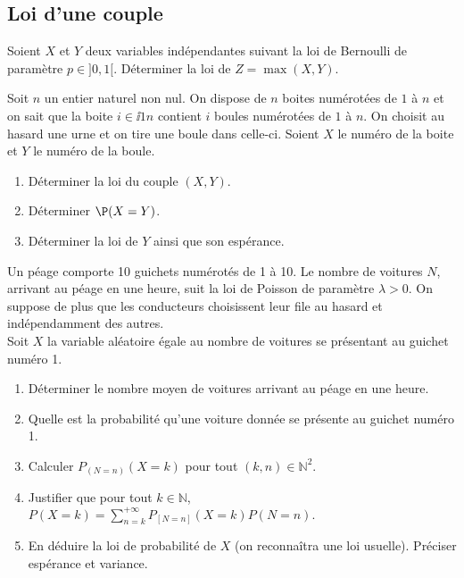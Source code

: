 \documentclass[a4paper,twoside,french,11pt]{VcCours}
\begin{document}
\subsection{Loi d'une couple}


\begin{Exercice}{} Soient $X$ et $Y$ deux variables indépendantes suivant la loi de Bernoulli de paramètre $p \in ]0,1[$. Déterminer la loi de $Z= \max(X,Y)$.
\end{Exercice}

\begin{Exercice}{} Soit $n$ un entier naturel non nul. On dispose de $n$ boites numérotées de $1$ à $n$ et on sait que la boite $i \in \ii{1}{n}$ contient $i$ boules numérotées de $1$ à $n$. On choisit au hasard une urne et on tire une boule dans celle-ci. Soient $X$ le numéro de la boite et $Y$ le numéro de la boule. 

\begin{enumerate}
\item Déterminer la loi du couple $(X,Y)$.
\item Déterminer $\P(X=Y)$.
\item Déterminer la loi de $Y$ ainsi que son espérance.
\end{enumerate}
\end{Exercice}

\begin{Exercice}{} Un péage comporte 10 guichets numérotés de 1 à 10. Le nombre de voitures $N$, arrivant au péage en une heure, suit la loi de Poisson de paramètre $\lambda>0$. On suppose de plus que les conducteurs choisissent leur file au hasard et indépendamment des autres.\\
Soit $X$ la variable aléatoire égale au nombre de voitures se présentant au guichet numéro 1.
\begin{enumerate}
\item Déterminer le nombre moyen de voitures arrivant au péage en une heure.
\item Quelle est la probabilité qu'une voiture donnée se présente au guichet numéro 1.
\item Calculer $P_{(N=n)}(X=k)$ pour tout $(k,n) \in \mathbb{N}^2$.
\item Justifier que pour tout $k \in \mathbb{N}$, ${P(X=k)=\sum_{n=k}^{+\infty}P_{[N=n]}(X=k) P(N=n).}$
\item En déduire la loi de probabilité de $X$ (on reconnaîtra une loi usuelle). Préciser espérance et variance.
\end{enumerate}
\end{Exercice}
\end{document}

